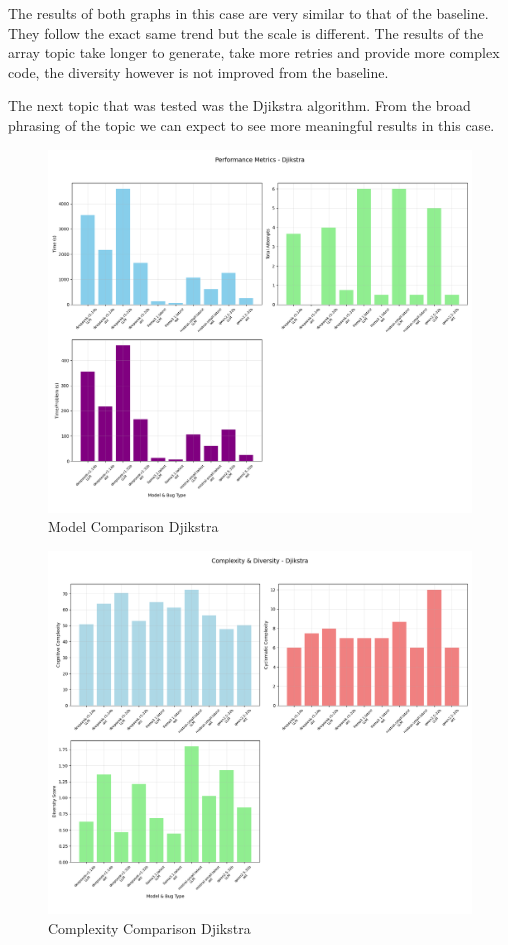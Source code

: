\documentclass[12pt]{extarticle}
\begin{document}
The results of both graphs in this case are very similar to that of the baseline. They follow the exact same trend but the scale is different. The results of the array topic take longer to generate, take more retries and provide more complex code, the diversity however is not improved from the baseline.

The next topic that was tested was the Djikstra algorithm. From the broad phrasing of the topic we can expect to see more meaningful results in this case.

\begin{figure}[H]
\centering
\includegraphics[width=0.7\linewidth]{Images/Model_Comparison_Djikstra.png}
\caption{Model Comparison Djikstra}
\label{fig:Model_Comparison_Djikstra}
\end{figure}

\begin{figure}[H]
\centering
\includegraphics[width=0.8\linewidth]{Images/Complexity_Comparison_Djikstra.png}
\caption{Complexity Comparison Djikstra}
\label{fig:Complexity_Comparison_Djikstra}
\end{figure}
\end{document}
